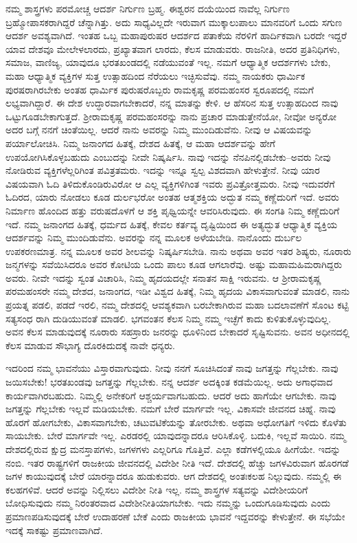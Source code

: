 ನಮ್ಮ ಶಾಸ್ತ್ರಗಳು ಪರಮೋಚ್ಚ ಆದರ್ಶ ನಿರ್ಗುಣ ಬ್ರಹ್ಮ. ಈಶ್ವರನ ದಯೆಯಿಂದ ನಾವೆಲ್ಲ ನಿರ್ಗುಣ ಬ್ರಹ್ಮೋಪಾಸಕರಾಗಿದ್ದರೆ ಚೆನ್ನಾಗಿತ್ತು. ಅದು ಸಾಧ್ಯವಿಲ್ಲದೇ ಇರುವಾಗ ಮುಕ್ಕಾಲುಪಾಲು ಮಾನವರಿಗೆ ಒಂದು ಸಗುಣ ಆದರ್ಶ ಅವಶ್ಯವಾಗಿದೆ. ಇಂತಹ ಒಬ್ಬ ಮಹಾಪುರುಷರ ಆದರ್ಶದ ಪತಾಕೆಯ ನೆರಳಿಗೆ ಹಾರ್ದಿಕವಾಗಿ ಬರದೇ ಇದ್ದರೆ ಯಾವ ದೇಶವೂ ಮೇಲೇಳಲಾರದು, ಪ್ರಖ್ಯಾತವಾಗ ಲಾರದು, ಕೆಲಸ ಮಾಡುವರು. ರಾಜನೀತಿ, ಅದರ ಪ್ರತಿನಿಧಿಗಳು, ಸಮಾಜ, ವಾಣಿಜ್ಯ, ಯಾವುದೂ ಭರತಖಂಡದಲ್ಲಿ ನಡೆಯುವಂತೆ ಇಲ್ಲ. ನಮಗೆ ಆಧ್ಯಾತ್ಮಿಕ ಆದರ್ಶಗಳು ಬೇಕು, ಮಹಾ ಆಧ್ಯಾತ್ಮಿಕ ವ್ಯಕ್ತಿಗಳ ಸುತ್ತ ಉತ್ಸಾಹದಿಂದ ನೆರೆಯಲು ಇಚ್ಛಿಸುವೆವು. ನಮ್ಮ ನಾಯಕರು ಧಾರ್ಮಿಕ ಪುರಷರಾಗಿರಬೇಕು ಅಂತಹ ಧಾರ್ಮಿಕ ಪುರುಷರೊಬ್ಬರು ರಾಮಕೃಷ್ಣ ಪರಮಹಂಸರ ಸ್ವರೂಪದಲ್ಲಿ ನಮಗೆ ಲಭ್ಯವಾಗಿದ್ದಾರೆ. ಈ ದೇಶ ಉದ್ಧಾರವಾಗಬೇಕಾದರೆ, ನನ್ನ ಮಾತನ್ನು ಕೇಳಿ. ಆ ಹೆಸರಿನ ಸುತ್ತ ಉತ್ಸಾಹದಿಂದ ನಾವು ಒಟ್ಟುಗೂಡಬೇಕಾಗುತ್ತದೆ. ಶ‍್ರೀರಾಮಕೃಷ್ಣ ಪರಮಹಂಸರನ್ನು ನಾನು ಪ್ರಚಾರ ಮಾಡುತ್ತೇನೆಯೋ, ನೀವೋ ಅನ್ಯರೋ ಅದರ ಬಗ್ಗೆ ನನಗೆ ಚಿಂತೆಯಿಲ್ಲ. ಆದರೆ ನಾನು ಅವರನ್ನು ನಿಮ್ಮ ಮುಂದಿಡುವೆನು. ನೀವು ಆ ವಿಷಯವನ್ನು ಪರ್ಯಾಲೋಚಿಸಿ. ನಿಮ್ಮ ಜನಾಂಗದ ಹಿತಕ್ಕೆ, ದೇಶದ ಹಿತಕ್ಕೆ, ಆ ಮಹಾ ಆದರ್ಶವನ್ನು ಹೇಗೆ ಉಪಯೋಗಿಸಿಕೊಳ್ಳಬಹುದು ಎಂಬುದನ್ನು ನೀವೇ ನಿಷ್ಕರ್ಷಿಸಿ. ನಾವು ಇದನ್ನು ನೆನಪಿನಲ್ಲಿಡಬೇಕು–ಅವರು ನೀವು ನೋಡಿರುವ ವ್ಯಕ್ತಿಗಳೆಲ್ಲರಿಗಿಂತ ಪವಿತ್ರತಮರು. ಇದನ್ನು ಇನ್ನೂ ಸ್ವಲ್ಪ ವಿಶದವಾಗಿ ಹೇಳುತ್ತೇನೆ. ನೀವು ಯಾರ ವಿಷಯವಾಗಿ ಓದಿ ತಿಳಿದುಕೊಂಡಿರುವಿರೋ ಆ ಎಲ್ಲ ವ್ಯಕ್ತಿಗಳಿಗಿಂತ ಇವರು ಪ್ರವಿತ್ರೋತ್ತಮರು. ನೀವು ಇದುವರೆಗೆ ಓದಿರದ, ಯಾರು ನೋಡಲು ಕೂಡ ದುರ್ಲಭರೋ ಅಂತಹ ಆತ್ಮಶಕ್ತಿಯ ಅದ್ಭುತ ನಮ್ಮ ಕಣ್ಣೆದುರಿಗೆ ಇದೆ. ಅವರು ನಿರ್ಮಾಣ ಹೊಂದಿದ ಹತ್ತು ವರುಷದೊಳಗೆ ಆ ಶಕ್ತಿ ಪೃಥ್ವಿಯನ್ನೇ ಆವರಿಸಿರುವುದು. ಈ ಸಂಗತಿ ನಿಮ್ಮ ಕಣ್ಣೆದುರಿಗೆ ಇದೆ. ನಮ್ಮ ಜನಾಂಗದ ಹಿತಕ್ಕೆ, ಧರ್ಮದ ಹಿತಕ್ಕೆ, ಕೇವಲ ಕರ್ತವ್ಯ ದೃಷ್ಟಿಯಿಂದ ಈ ಅತ್ಯದ್ಭುತ ಆಧ್ಯಾತ್ಮಿಕ ವ್ಯಕ್ತಿಯ ಆದರ್ಶವನ್ನು ನಿಮ್ಮ ಮುಂದಿಡುವೆನು. ಅವರನ್ನು ನನ್ನ ಮೂಲಕ ಅಳೆಯಬೇಡಿ. ನಾನೊಂದು ದುರ್ಬಲ ಉಪಕರಣಮಾತ್ರ. ನನ್ನ ಮೂಲಕ ಅವರ ಶೀಲವನ್ನು ನಿಷ್ಕರ್ಷಿಸಬೇಡಿ. ನಾನು ಅಥವಾ ಅವರ ಇತರ ಶಿಷ್ಯರು, ನೂರಾರು ಜನ್ಮಗಳನ್ನು ಸವೆಯಿಸಿದರೂ ಅವರ ಕೋಟಿಯ ಒಂದು ಪಾಲು ಕೂಡ ಆಗಲಾರೆವು. ಅಷ್ಟು ಮಹಾಮಹಿಮರಾಗಿದ್ದರು ಅವರು. ನೀವೇ ಇದನ್ನು ಸ್ವಂತ ವಿಚಾರಿಸಿ, ನಿಮ್ಮ ಹೃದಯದಲ್ಲೇ ಸನಾತನ ಸಾಕ್ಷಿ ಇರುವನು. ಆ ಶ‍್ರೀರಾಮಕೃಷ್ಣ ಪರಮಹಂಸರೇ ನಮ್ಮ ದೇಶದ, ಜನಾಂಗದ, ಇಡೀ ವಿಶ್ವದ ಹಿತಕ್ಕೆ, ನಿಮ್ಮ ಹೃದಯ ವಿಕಾಸವಾಗುವಂತೆ ಮಾಡಲಿ, ನಾನು ಪ್ರಯತ್ನ ಪಡಲಿ, ಪಡದೆ ಇರಲಿ, ನಮ್ಮ ದೇಶದಲ್ಲಿ ಆವಶ್ಯಕವಾಗಿ ಬರಬೇಕಾಗಿರುವ ಮಹಾ ಬದಲಾವಣೆಗೆ ಸೊಂಟ ಕಟ್ಟಿ ಸತ್ಯಸಂಧ ರಾಗಿ ದುಡಿಯುವಂತೆ ಮಾಡಲಿ. ಭಗವಂತನ ಕೆಲಸ ನಿಮ್ಮ ನಮ್ಮ ಇಚ್ಛೆಗೆ ಕಾದು ಕುಳಿತುಕೊಳ್ಳುವುದಿಲ್ಲ. ಅವನ ಕೆಲಸ ಮಾಡುವುದಕ್ಕೆ ನೂರಾರು ಸಹಸ್ರಾರು ಜನರನ್ನು ಧೂಳಿನಿಂದ ಬೇಕಾದರೆ ಸೃಷ್ಟಿಸುವನು. ಅವನ ಅಧೀನದಲ್ಲಿ ಕೆಲಸ ಮಾಡುವ ಸೌಭಾಗ್ಯ ದೊರಕಿದುದಕ್ಕೆ ನಾವೇ ಧನ್ಯರು. 

ಇದರಿಂದ ನಮ್ಮ ಭಾವನೆಯು ವಿಸ್ತಾರವಾಗುವುದು. ನೀವು ನನಗೆ ಸೂಚಿಸಿದಂತೆ ನಾವು ಜಗತ್ತನ್ನು ಗೆಲ್ಲಬೇಕು. ನಾವು ಜಯಿಸಬೇಕು! ಭರತಖಂಡವು ಜಗತ್ತನ್ನು ಗೆಲ್ಲಬೇಕು. ನನ್ನ ಆದರ್ಶ ಅದಕ್ಕಿಂತ ಕಡಮೆಯಿಲ್ಲ. ಅದು ಅಗಾಧವಾದ ಕಾರ್ಯವಾಗಿರಬಹುದು. ನಿಮ್ಮಲ್ಲಿ ಅನೇಕರಿಗೆ ಆಶ್ಚರ್ಯವಾಗಬಹುದು. ಆದರೆ ಅದು ಹಾಗೆಯೇ ಆಗಬೇಕು. ನಾವು ಜಗತ್ತನ್ನು ಗೆಲ್ಲಬೇಕು ಇಲ್ಲವೆ ಮಡಿಯಬೇಕು. ನಮಗೆ ಬೇರೆ ಮಾರ್ಗವೇ ಇಲ್ಲ. ವಿಕಾಸವೇ ಜೀವನದ ಚಿಹ್ನೆ. ನಾವು ಹೊರಗೆ ಹೋಗಬೇಕು, ವಿಕಾಸವಾಗಬೇಕು, ಚಟುವಟಿಕೆಯನ್ನು ತೋರಬೇಕು. ಅಥವಾ ಅಧೋಗತಿಗೆ ಇಳಿದು ಕೊಳೆತು ಸಾಯಬೇಕು. ಬೇರೆ ಮಾರ್ಗವೇ ಇಲ್ಲ. ಎರಡರಲ್ಲಿ ಯಾವುದನ್ನಾದರೂ ಆರಿಸಿಕೊಳ್ಳಿ. ಬದುಕಿ, ಇಲ್ಲವೆ ಸಾಯಿರಿ. ನಮ್ಮ ದೇಶದಲ್ಲಿರುವ ಕ್ಷುದ್ರ ಮನಸ್ತಾಪಗಳು, ಜಗಳಗಳು ಎಲ್ಲರಿಗೂ ಗೊತ್ತಿವೆ. ಎಲ್ಲಾ ಕಡೆಗಳಲ್ಲಿಯೂ ಹೀಗೆಯೇ. ಇದನ್ನು ನಂಬಿ. ಇತರ ರಾಷ್ಟ್ರಗಳಿಗೆ ರಾಜಕೀಯ ಜೀವನದಲ್ಲಿ ವಿದೇಶೀ ನೀತಿ ಇದೆ. ದೇಶದಲ್ಲಿ ಹೆಚ್ಚು ಜಗಳವಿರುವಾಗ ಹೊರಗಡೆ ಜಗಳ ಕಾಯುವುದಕ್ಕೆ ಬೇರೆ ಯಾರನ್ನಾದರೂ ಹುಡುಕುವರು. ಆಗ ದೇಶದಲ್ಲಿ ಅಂತಃಕಲಹ ನಿಲ್ಲುವುದು. ನಮ್ಮಲ್ಲಿ ಈ ಕಲಹಗಳಿವೆ. ಆದರೆ ಅವನ್ನು ನಿಲ್ಲಿಸಲು ವಿದೇಶೀ ನೀತಿ ಇಲ್ಲ. ನಮ್ಮ ಶಾಸ್ತ್ರಗಳ ಸತ್ಯವನ್ನು ವಿದೇಶೀಯರಿಗೆ ಬೋಧಿಸುವುದು ನಮ್ಮ ನಿರಂತರವಾದ ವಿದೇಶೀನೀತಿಯಾಗಬೇಕು. ಇದು ನಮ್ಮನ್ನು ಒಂದುಗೂಡಿಸುವುದು ಎಂದು ಪ್ರಮಾಣಪಡಿಸುವುದಕ್ಕೆ ಬೇರೆ ಉದಾಹರಣೆ ಬೇಕೆ ಎಂದು ರಾಜಕೀಯ ಭಾವನೆ ಇದ್ದವರನ್ನು ಕೇಳುತ್ತೇನೆ. ಈ ಸಭೆಯೇ ಇದಕ್ಕೆ ಸಾಕಷ್ಟು ಪ್ರಮಾಣವಾಗಿದೆ. 

